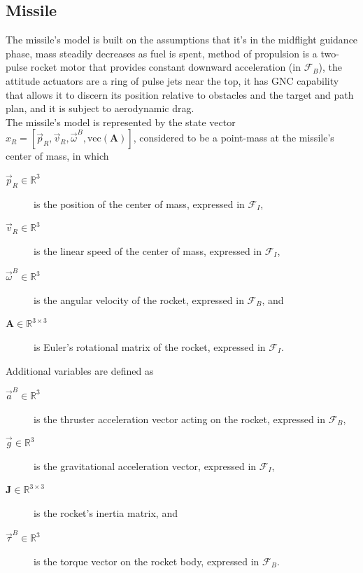 \subsection{Missile}
\label{subsec:missile}
The missile's model is built on the assumptions that it's in the midflight guidance phase, mass steadily decreases as fuel is spent, method of propulsion is a two-pulse rocket motor that provides constant downward acceleration (in $\mathcal{F}_B$), the attitude actuators are a ring of pulse jets near the top, it has GNC capability that allows it to discern its position relative to obstacles and the target and path plan, and it is subject to aerodynamic drag. \\

The missile's model is represented by the state vector $x_R = [\vec{p}_{R}, \vec{v}_{R}, \vec{\omega}^B, \text{vec}(\mathbf{A})]$, considered to be a point-mass at the missile's center of mass, in which
\begin{description}
    \item[$\vec{p}_{R} \in \mathbb{R}^3$] is the position of the center of mass, expressed in $\mathcal{F}_I$,
    \item[$\vec{v}_{R} \in \mathbb{R}^3$] is the linear speed of the center of mass, expressed in $\mathcal{F}_I$,
    \item[$\vec{\omega}^B \in \mathbb{R}^3$] is the angular velocity of the rocket, expressed in $\mathcal{F}_B$, and
    \item[$\mathbf{A} \in \mathbb{R}^{3 \times 3}$] is Euler's rotational matrix of the rocket, expressed in $\mathcal{F}_I$. \\
\end{description}

Additional variables are defined as
\begin{description}
    \item[$\vec{a}^B \in \mathbb{R}^3$] is the thruster acceleration vector acting on the rocket, expressed in $\mathcal{F}_B$,
    \item[$\vec{g} \in \mathbb{R}^3$] is the gravitational acceleration vector, expressed in $\mathcal{F}_I$,
    \item[$\mathbf{J} \in \mathbb{R}^{3 \times 3}$] is the rocket's inertia matrix, and
    \item[$\vec{\tau}^B \in \mathbb{R}^3$] is the torque vector on the rocket body, expressed in $\mathcal{F}_B$.\\
\end{description}

